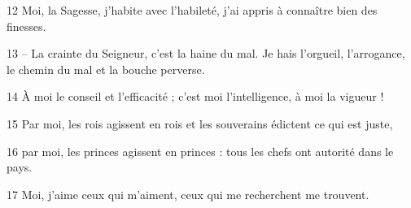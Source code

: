 
12 Moi, la Sagesse, j’habite avec l’habileté, j’ai appris à connaître bien des finesses.

13 – La crainte du Seigneur, c’est la haine du mal. Je hais l’orgueil, l’arrogance, le chemin du mal et la bouche perverse.

14 À moi le conseil et l’efficacité ; c’est moi l’intelligence, à moi la vigueur !

15 Par moi, les rois agissent en rois et les souverains édictent ce qui est juste,

16 par moi, les princes agissent en princes : tous les chefs ont autorité dans le pays.

17 Moi, j’aime ceux qui m’aiment, ceux qui me recherchent me trouvent.
